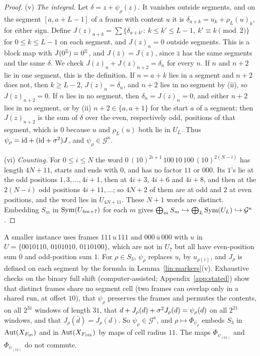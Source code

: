\begin{proof}
(v) \emph{The integral.} Let $\delta=z+\psi_\rho(z)$. It vanishes outside segments, and on the segment $[a,a+L-1]$ of a frame with content $u$ it is $\delta_{a+k}=u_k+\rho_L(u)_k$, for either sign. Define $J(z)_{a+k}=\sum\{\delta_{a+k'}:\ k\le k'\le L-1,\ k'\equiv k\pmod 2\}$ for $0\le k\le L-1$ on each segment, and $J(z)_n=0$ outside segments. This is a block map with $J(0^{\mathbb{Z}})=0^{\mathbb{Z}}$, and $J(\bar z)=J(z)$, since $\bar z$ has the same segments and the same $\delta$. We check $J(z)_n+J(z)_{n+2}=\delta_n$ for every $n$. If $n$ and $n+2$ lie in one segment, this is the definition. If $n=a+k$ lies in a segment and $n+2$ does not, then $k\ge L-2$, $J(z)_n=\delta_n$, and $n+2$ lies in no segment by (ii), so $J(z)_{n+2}=0$. If $n$ lies in no segment, then $\delta_n=J(z)_n=0$, and either $n+2$ lies in no segment, or by (ii) $n+2\in\{a,a+1\}$ for the start $a$ of a segment; then $J(z)_{n+2}$ is the sum of $\delta$ over the even, respectively odd, positions of that segment, which is $0$ because $u$ and $\rho_L(u)$ both lie in $U_L$. Thus $\psi_\rho=\mathrm{id}+(\mathrm{id}+\sigma^2)J$, and $\psi_\rho\in\mathcal G^{\kappa}$.

(vi) \emph{Counting.} For $0\le i\le N$ the word $0\,(10)^{2i+1}\,100\,10\,100\,(10)^{2(N-i)}$ has length $4N+11$, starts and ends with $0$, and has no factor $11$ or $000$. Its $1$'s lie at the odd positions $1,3,\dots,4i+1$, then at $4i+3$, $4i+6$ and $4i+8$, and then at the $2(N-i)$ odd positions $4i+11,\dots$; so $4N+2$ of them are at odd and $2$ at even positions, and the word lies in $U_{4N+11}$. These $N+1$ words are distinct. Embedding $S_m$ in $\operatorname{Sym}(U_{4m+7})$ for each $m$ gives $\bigoplus_mS_m\hookrightarrow\bigoplus_L\operatorname{Sym}(U_L)\hookrightarrow\mathcal G^{\kappa}$.
\end{proof}

\begin{sloppypar}
\begin{example}\label{lin:ex:S3}
A smaller instance uses frames $111\,u\,111$ and $000\,\bar u\,000$ with $u$ in $U=\{0010110,\,0101010,\,0110100\}$, which are not in $U_7$ but all have even-position sum $0$ and odd-position sum $1$. For $\rho\in S_3$, $\psi_\rho$ replaces $u_i$ by $u_{\rho(i)}$, and $J_\rho$ is defined on each segment by the formula in Lemma~\ref{lin:markers}(v). Exhaustive checks on the binary full shift (computer-assisted; Appendix~\ref{app:stated}) show that distinct frames share no segment cell (two frames can overlap only in a shared run, at offset $10$), that $\psi_\rho$ preserves the frames and permutes the contents, on all $2^{31}$ windows of length $31$, that $d+J_\rho(d)+\sigma^2J_\rho(d)=\psi_\rho(d)$ on all $2^{21}$ windows, and that $J_\rho(\bar d)=J_\rho(d)$. So $\psi_\rho\in\mathcal G^{\kappa}$, and $\rho\mapsto\Phi_{\psi_\rho}$ embeds $S_3$ in $\operatorname{Aut}(X_{F_{90}})$ and in $\operatorname{Aut}(X_{F_{165}})$ by maps of cell radius $11$. The maps $\Phi_{\psi_{(01)}}$ and $\Phi_{\psi_{(12)}}$ do not commute.
\end{example}
\end{sloppypar}

